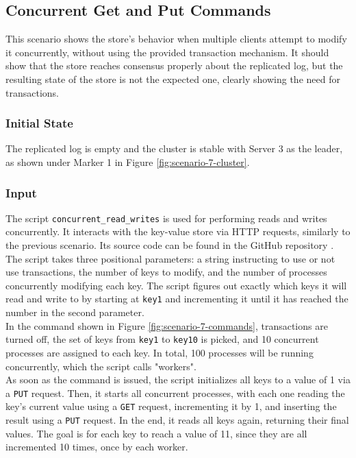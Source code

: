 \subsection{Concurrent Get and Put Commands}

This scenario shows the store's behavior when multiple clients attempt to modify it concurrently, without using the provided transaction mechanism. It should show that the store reaches consensus properly about the replicated log, but the resulting state of the store is not the expected one, clearly showing the need for transactions.

\subsubsection{Initial State}

The replicated log is empty and the cluster is stable with Server 3 as the leader, as shown under Marker 1 in Figure \ref{fig:scenario-7-cluster}.

\subsubsection{Input}

The script \lstinline{concurrent_read_writes} is used for performing reads and writes concurrently. It interacts with the key-value store via HTTP requests, similarly to the previous scenario. Its source code can be found in the GitHub repository \cite{stoufexis-raft}.\\

The script takes three positional parameters: a string instructing to use or not use transactions, the number of keys to modify, and the number of processes concurrently modifying each key. The script figures out exactly which keys it will read and write to by starting at \lstinline|key1| and incrementing it until it has reached the number in the second parameter.\\

In the command shown in Figure \ref{fig:scenario-7-commands}, transactions are turned off, the set of keys from \lstinline|key1| to \lstinline|key10| is picked, and 10 concurrent processes are assigned to each key. In total, 100 processes will be running concurrently, which the script calls "workers".\\

As soon as the command is issued, the script initializes all keys to a value of 1 via a \lstinline|PUT| request. Then, it starts all concurrent processes, with each one reading the key's current value using a \lstinline|GET| request, incrementing it by 1, and inserting the result using a \lstinline|PUT| request. In the end, it reads all keys again, returning their final values. The goal is for each key to reach a value of 11, since they are all incremented 10 times, once by each worker.


